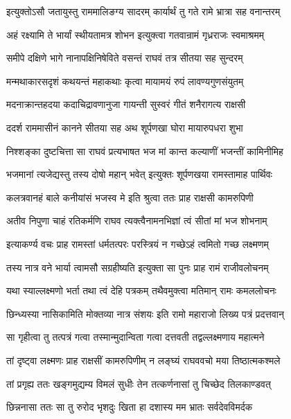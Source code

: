 \twolineshloka
{इत्युक्तोऽसौ जतायुस्तु राममालिङग्य सादरम्}
{कार्यार्थं तु गते रामे भ्रात्रा सह वनान्तरम्} %

\twolineshloka
{अहं रक्ष्यामि ते भार्यां स्थीयतामत्र शोभन}
{इत्युक्त्वा गतवान्रामं गृध्रराजः स्वमाश्रमम्} %

\twolineshloka
{समीपे दक्षिणे भागे नानापक्षिनिषेविते}
{वसन्तं राघवं तत्र सीतया सह सुन्दरम्} %

\twolineshloka
{मन्मथाकारसदृशं कथयन्तं महाकथाः}
{कृत्वा मायामयं रुपं लावण्यगुणसंयुतम्} %

\twolineshloka
{मदनाक्रान्तहदया कदाचिद्रावणानुजा}
{गायन्ती सुस्वरं गीतं शनैरागत्य राक्षसी} %

\twolineshloka
{ददर्श राममासीनं कानने सीतया सह}
{अथ शूर्पणखा घोरा मायारुपधरा शुभा} %

\twolineshloka
{निश्शङ्का दुष्टचित्ता सा राघवं प्रत्यभाषत}
{भज मां कान्त कल्याणीं भजन्तीं कामिनीमिह} %

\twolineshloka
{भजमानां त्यजेद्यस्तु तस्य दोषो महान् भवेत्}
{इत्युक्तः शूर्पणखया रामस्तामाह पार्थिवः} %

\twolineshloka
{कलत्रवानहं बाले कनीयांसं भजस्व मे}
{इति श्रुत्वा ततः प्राह राक्षसी कामरुपिणी} %

\twolineshloka
{अतीव निपुणा चाहं रतिकर्मणि राघव}
{त्यक्त्वैनामनभिज्ञां त्वं सीतां मां भज शोभनाम्} %

\twolineshloka
{इत्याकर्ण्य वचः प्राह रामस्तां धर्मतत्परः}
{परस्त्रियं न गच्छेऽहं त्वमितो गच्छ लक्ष्मणम्} %

\twolineshloka
{तस्य नात्र वने भार्या त्वामसौ सग्रहीष्यति}
{इत्युक्ता सा पुनः प्राह रामं राजीवलोचनम्} %

\twolineshloka
{यथा स्याल्लक्ष्मणो भर्ता तथा त्वं देहि पत्रकम्}
{तथैवमुक्त्वा मतिमान् रामः कमललोचनः} %

\twolineshloka
{छिन्ध्यस्या नासिकामिति मोक्तव्या नात्र संशयः}
{इति रामो महाराजो लिख्य पत्रं प्रदत्तवान्} %

\twolineshloka
{सा गृहीत्वा तु तत्पत्रं गत्वा तस्मान्मुदान्विता}
{गत्वा दत्तवती तद्वल्लक्ष्मणाय महात्मने} %

\twolineshloka
{तां दृष्ट्वा लक्ष्मणः प्राह राक्षसीं कामरुपिणीम्}
{न लङ्घ्यं राघववचो मया तिष्ठात्मकश्मले} %

\twolineshloka
{तां प्रगृह्य ततः खङ्गमुद्यम्य विमलं सुधीः}
{तेन तत्कर्णनासां तु चिच्छेद तिलकाण्डवत्} %

\twolineshloka
{छिन्ननासा ततः सा तु रुरोद भृशदुः खिता}
{हा दशास्य मम भ्रातः सर्वदेवविमर्दक} %

